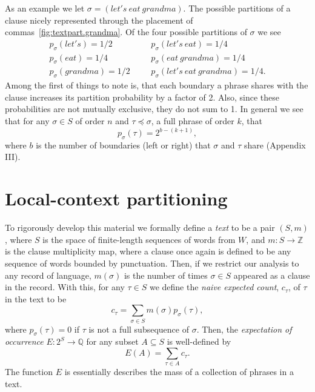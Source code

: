 As an example we let $\sigma=(let's\:eat\:grandma)$.  The possible
partitions of a clause nicely represented through the placement of
commas~\ref{fig:textpart.grandma}.
Of the four possible partitions of $\sigma$ we see
\begin{align*}
p_\sigma(let's)=1/2 \hspace{30pt}&\hspace{10pt} p_\sigma(let's\:eat)=1/4\\
p_\sigma(eat)=1/4 \hspace{36pt}&\hspace{10pt} p_\sigma(eat\:grandma)=1/4\\
p_\sigma(grandma)=1/2 \hspace{10pt}&\hspace{10pt} p_\sigma(let's\:eat\:grandma)=1/4.
\end{align*}
Among the first of things to note is, that each boundary a phrase
shares with the clause increases its partition probability by a factor
of 2. Also, since these probabilities are not mutually exclusive, they
do not sum to 1. In general we see that for any $\sigma\in S$ of order
$n$ and $\tau\preceq\sigma$, a full phrase of order $k$, that
$$
p_\sigma(\tau)
=
2^{b-(k+1)},
$$
where $b$ is the number of boundaries (left or right) that $\sigma$
and $\tau$ share (Appendix III).

\section{Local-context partitioning}

To rigorously develop this material we formally define a \emph{text}
to be a pair $(S,m)$, where $S$ is the space of finite-length
sequences of words from $W$, and $m:S\rightarrow \mathbb{Z}$ is the
clause multiplicity map, where a clause once again is defined to be
any sequence of words bounded by punctuation. Then, if we restrict our
analysis to any record of language, $m(\sigma)$ is the number of times
$\sigma\in S$ appeared as a clause in the record. With this, for any
$\tau\in S$ we define the \emph{naive expected count}, $c_\tau$, of
$\tau$ in the text to be
$$
c_\tau
=
\sum_{\sigma\in S}
m(\sigma)
p_{\sigma}(\tau),
$$
where $p_{\sigma}(\tau)=0$ if $\tau$ is not a full subsequence of
$\sigma$. Then, the \emph{expectation of occurrence} $E:2^S\rightarrow
\mathbb{Q}$ for any subset $A\subseteq S$ is well-defined by
$$
E(A)=\sum_{\tau\in A}c_\tau.
$$
The function $E$ is essentially describes the mass of a collection of
phrases in a text.


